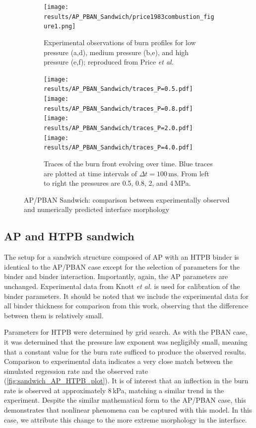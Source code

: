 \documentclass[colorinlistoftodos,review]{elsarticle}
\begin{document}
\begin{figure}
  \begin{subfigure}{0.48\linewidth}\centering
    \texttt{[image: results/AP\_PBAN\_Sandwich/price1983combustion\_figure1.png]}
    \caption{ Experimental observations of burn profiles for low pressure (a,d), medium pressure (b,e), and high pressure (e,f); reproduced from Price {\it et al.} \cite[Fig 1]{price1983combustion}}
    \label{fig:sandwich_shape}
  \end{subfigure}\hfill
  \begin{subfigure}{0.48\linewidth}\centering
    \texttt{[image: results/AP\_PBAN\_Sandwich/traces\_P=0.5.pdf]}%
    \texttt{[image: results/AP\_PBAN\_Sandwich/traces\_P=0.8.pdf]}%
    \texttt{[image: results/AP\_PBAN\_Sandwich/traces\_P=2.0.pdf]}%
    \texttt{[image: results/AP\_PBAN\_Sandwich/traces\_P=4.0.pdf]}
    \caption{Traces of the burn front evolving over time. Blue traces are plotted at time intervals of $\Delta t = 100\,\mathrm{ms}$. From left to right the pressures are 0.5, 0.8, 2, and 4\,MPa.}
    \label{fig:sandwich_ap_pban_traces}
  \end{subfigure}
  \caption{AP/PBAN Sandwich: comparison between experimentally observed and numerically predicted interface morphology}
\end{figure}

\subsection{AP and HTPB sandwich}


The setup for a sandwich structure composed of AP with an HTPB binder is identical to the AP\slash PBAN case except for the selection of parameters for the binder and binder interaction.
Importantly, again, the AP parameters are unchanged.
Experimental data from Knott {\it et al.} \cite{knott2002modeling} is used for calibration of the binder parameters.
It should be noted that we include the experimental data for all binder thickness for comparison from this work, observing that the difference between them is relatively small.

Parameters for HTPB were determined by grid search.
As with the PBAN case, it was determined that the pressure law exponent was negligibly small, meaning that a constant value for the burn rate sufficed to produce the observed results.
Comparison to experimental data indicates a very close match between the simulated regression rate and the observed rate (\cref{fig:sandwich_AP_HTPB_plot}).
It is of interest that an inflection in the burn rate is observed at approximately 8\,kPa, matching a similar trend in the experiment.
Despite the similar mathematical form to the AP\slash PBAN case, this demonstrates that nonlinear phenomena can be captured with this model.
In this case, we attribute this change to the more extreme morphology in the interface.
\end{document}
